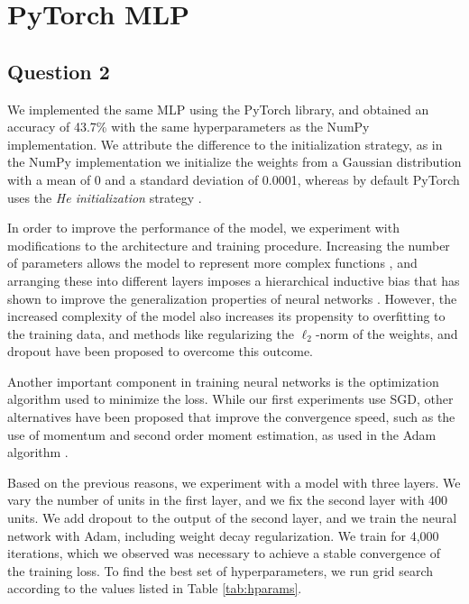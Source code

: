 \documentclass{article}
\begin{document}
\section{PyTorch MLP}

\subsection*{Question 2}
We implemented the same MLP using the PyTorch library, and obtained an accuracy of 43.7\% with the same hyperparameters as the NumPy implementation. We attribute the difference to the initialization strategy, as in the NumPy implementation we initialize the weights from a Gaussian distribution with a mean of 0 and a standard deviation of 0.0001, whereas by default PyTorch uses the \textit{He initialization} strategy \cite{he2015delving}.

In order to improve the performance of the model, we experiment with modifications to the architecture and training procedure. Increasing the number of parameters allows the model to represent more complex functions \cite{hornik1991approximation}, and arranging these into different layers imposes a hierarchical inductive bias that has shown to improve the generalization properties of neural networks \cite{bengio2007greedy,bengio2013representation}. However, the increased complexity of the model also increases its propensity to overfitting to the training data, and methods like regularizing the $\ell_2$-norm of the weights, and dropout \cite{srivastava2014dropout} have been proposed to overcome this outcome.

Another important component in training neural networks is the optimization algorithm used to minimize the loss. While our first experiments use SGD, other alternatives have been proposed that improve the convergence speed, such as the use of momentum  \cite{polyak1964momentum,sutskever2013nesterov} and second order moment estimation, as used in the Adam algorithm \citep{krizhevsky2009learning}.

Based on the previous reasons, we experiment with a model with three layers. We vary the number of units in the first layer, and we fix the second layer with 400 units. We add dropout to the output of the second layer, and we train the neural network with Adam, including weight decay regularization. We train for 4,000 iterations, which we observed was necessary to achieve a stable convergence of the training loss. To find the best set of hyperparameters, we run grid search according to the values listed in Table \ref{tab:hparams}.
\end{document}
